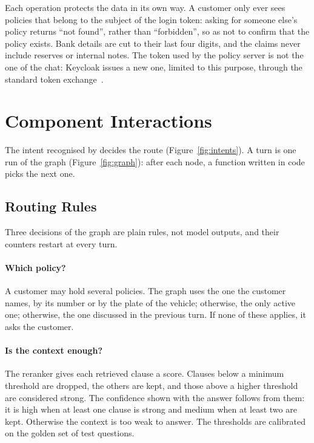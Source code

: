 Each operation protects the data in its own way. A customer only ever sees policies that belong to
the subject of the login token: asking for someone else's policy returns \enquote{not found}, rather
than \enquote{forbidden}, so as not to confirm that the policy exists. Bank details are cut to their
last four digits, and the claims never include reserves or internal notes. The token used by the
policy server is not the one of the chat: Keycloak issues a new one, limited to this purpose,
through the standard token exchange~\cite{keycloak2026tokenexchange}.


\clearpage

\section{Component Interactions}
\label{sec:interactions}

The intent recognised by  decides the route (Figure~\ref{fig:intents}). A turn is
one run of the graph (Figure~\ref{fig:graph}): after each node, a function written in code picks
the next one.




\subsection{Routing Rules}
\label{sec:routing}

Three decisions of the graph are plain rules, not model outputs, and their counters restart at
every turn.

\paragraph{Which policy?} A customer may hold several policies. The graph uses the one the customer
names, by its number or by the plate of the vehicle; otherwise, the only active one; otherwise, the
one discussed in the previous turn. If none of these applies, it asks the customer.

\paragraph{Is the context enough?} The reranker gives each retrieved clause a score. Clauses below
a minimum threshold are dropped, the others are kept, and those above a higher threshold are
considered strong. The confidence shown with the answer follows from them: it is high when at least
one clause is strong and medium when at least two are kept. Otherwise the context is too weak to
answer. The thresholds are calibrated on the golden set of test questions.

